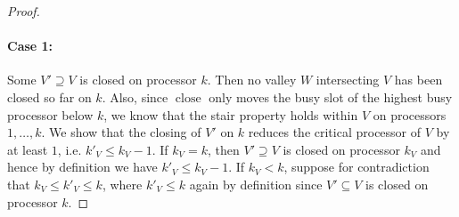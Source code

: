 \documentclass[a4paper]{article}
\DeclareMathOperator{\close}{close}
\begin{document}
\begin{proof}
  \paragraph{Case 1:}
      Some $V' \supseteq V$ is closed on processor $k$.
      Then no valley $W$ intersecting $V$ has been closed so far on $k$.
      Also, since $\close$ only moves the busy slot of the highest busy processor below $k$, we know that the stair property  holds within $V$ on processors $1, \ldots, k$.
      We show that the closing of $V'$ on $k$ reduces the critical processor of $V$ by at least $1$, i.e. $k'_V \leq k_V - 1$.
      If $k_V = k$, then $V' \supseteq V$ is closed on processor $k_V$ and hence by definition we have $k'_V \leq k_V - 1$.
      If $k_V < k$, suppose for contradiction that $k_V \leq k'_V \leq k$, where $k'_V \leq k$ again by definition since $V' \subseteq V$ is closed on processor $k$.


\end{proof}
\end{document}
